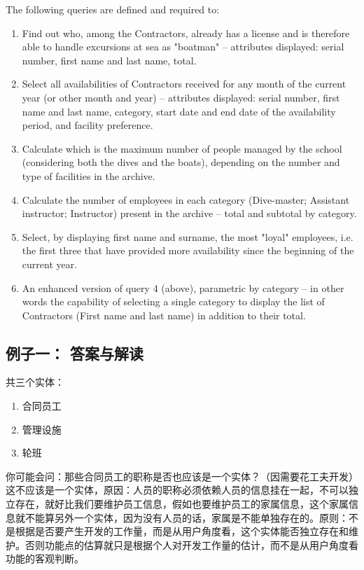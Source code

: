 The following queries are defined and required to:

\begin{enumerate}
\tightlist
\item
  Find out who, among the Contractors, already has a license and is
  therefore able to handle excursions at sea as "boatman" -- attributes
  displayed: serial number, first name and last name, total.
\item
  Select all availabilities of Contractors received for any month of the
  current year (or other month and year) -- attributes displayed: serial
  number, first name and last name, category, start date and end date of
  the availability period, and facility preference.
\item
  Calculate which is the maximum number of people managed by the school
  (considering both the dives and the boats), depending on the number
  and type of facilities in the archive.
\item
  Calculate the number of employees in each category (Dive-master;
  Assistant instructor; Instructor) present in the archive -- total and
  subtotal by category.
\item
  Select, by displaying first name and surname, the most "loyal"
  employees, i.e. the first three that have provided more availability
  since the beginning of the current year.
\item
  An enhanced version of query 4 (above), parametric by category -- in
  other words the capability of selecting a single category to display
  the list of Contractors (First name and last name) in addition to
  their total.
\end{enumerate}

\hypertarget{ux4f8bux5b50ux4e00-ux7b54ux6848ux4e0eux89e3ux8bfb}{%
\subsection{例子一：
答案与解读}\label{ux4f8bux5b50ux4e00-ux7b54ux6848ux4e0eux89e3ux8bfb}}

共三个实体：

\begin{enumerate}
\tightlist
\item
  合同员工
\item
  管理设施
\item
  轮班
\end{enumerate}

你可能会问：那些合同员工的职称是否也应该是一个实体？（因需要花工夫开发）\\
这不应该是一个实体，原因：人员的职称必须依赖人员的信息挂在一起，不可以独立存在，就好比我们要维护员工信息，假如也要维护员工的家属信息，这个家属信息就不能算另外一个实体，因为没有人员的话，家属是不能单独存在的。原则：不是根据是否要产生开发的工作量，而是从用户角度看，这个实体能否独立存在和维护。否则功能点的估算就只是根据个人对开发工作量的估计，而不是从用户角度看功能的客观判断。

